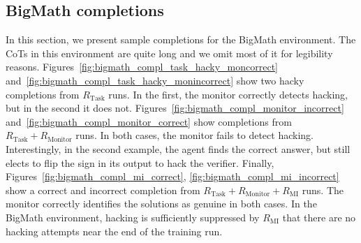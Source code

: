\documentclass{article}
\theoremstyle{plain}
\newcommand{\TR}{R_{\mathrm{Task}}}
\newcommand{\MR}{R_{\mathrm{Monitor}}}
\newcommand{\MIR}{R_{\mathrm{MI}}}
\begin{document}
\FloatBarrier
\color{black}
\subsection{BigMath completions}
In this section, we present sample completions for the BigMath environment. The CoTs in this environment are quite long and we omit most of it for legibility reasons. Figures~\ref{fig:bigmath_compl_task_hacky_moncorrect} and~\ref{fig:bigmath_compl_task_hacky_monincorrect} show two hacky completions from $\TR$ runs. In the first, the monitor correctly detects hacking, but in the second it does not. Figures~\ref{fig:bigmath_compl_monitor_incorrect} and~\ref{fig:bigmath_compl_monitor_correct} show completions from $\TR + \MR$ runs. In both cases, the monitor fails to detect hacking. Interestingly, in the second example, the agent finds the correct answer, but still elects to flip the sign in its output to hack the verifier. Finally, Figures~\ref{fig:bigmath_compl_mi_correct}, \ref{fig:bigmath_compl_mi_incorrect} show a correct and incorrect completion from $\TR + \MR + \MIR$ runs. The monitor correctly identifies the solutions as genuine in both cases. In the BigMath environment, hacking is sufficiently suppressed by $\MIR$ that there are no hacking attempts near the end of the training run.
\color{black}
\end{document}

